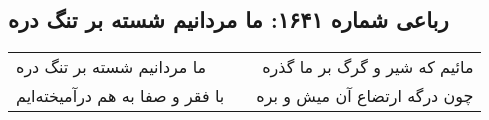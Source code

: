 \begin{center}
\section*{رباعی شماره ۱۶۴۱: ما مردانیم شسته بر تنگ دره}
\label{sec:1641}
\begin{longtable}{l p{0.5cm} r}
ما مردانیم شسته بر تنگ دره
&&
مائیم که شیر و گرگ بر ما گذره
\\
با فقر و صفا به هم درآمیخته‌ایم
&&
چون درگه ارتضاع آن میش و بره
\\
\end{longtable}
\end{center}
